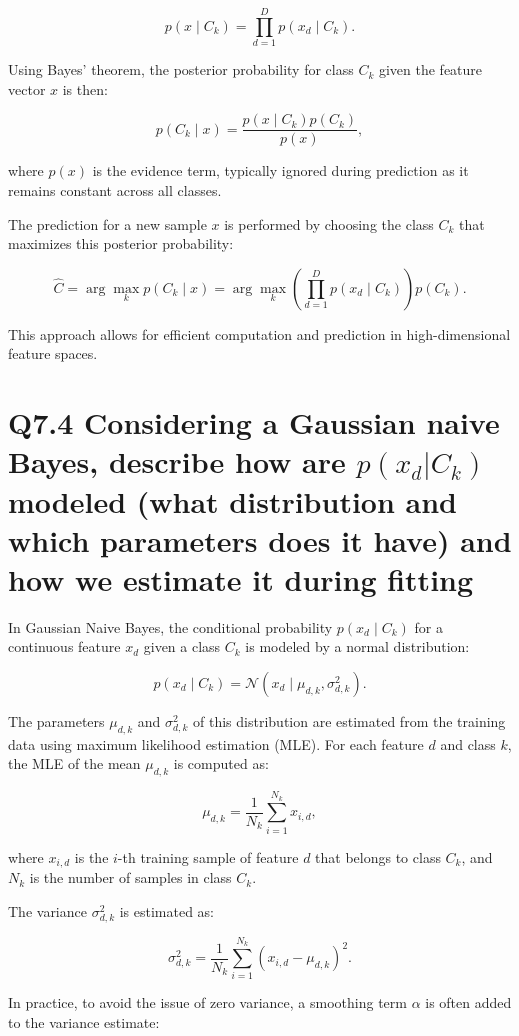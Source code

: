 \documentclass[11pt]{article}
\begin{document}
\[
p(x \mid C_k) = \prod_{d=1}^{D} p(x_d \mid C_k).
\]

Using Bayes' theorem, the posterior probability for class \( C_k \) given the feature vector \( x \) is then:

\[
p(C_k \mid x) = \frac{p(x \mid C_k) p(C_k)}{p(x)},
\]

where \( p(x) \) is the evidence term, typically ignored during prediction as it remains constant across all classes.

The prediction for a new sample \( x \) is performed by choosing the class \( C_k \) that maximizes this posterior probability:

\[
\hat{C} = \arg\max_k p(C_k \mid x) = \arg\max_k \left( \prod_{d=1}^{D} p(x_d \mid C_k) \right) p(C_k).
\]

This approach allows for efficient computation and prediction in high-dimensional feature spaces.

\section{Q7.4 Considering a Gaussian naive Bayes, describe how are $p(x_d|C_k)$ modeled (what distribution and which parameters does it have) and how we estimate it during fitting}

In Gaussian Naive Bayes, the conditional probability \( p(x_d \mid C_k) \) for a continuous feature \( x_d \) given a class \( C_k \) is modeled by a normal distribution:

\[
p(x_d \mid C_k) = \mathcal{N}(x_d \mid \mu_{d,k}, \sigma_{d,k}^2).
\]

The parameters \( \mu_{d,k} \) and \( \sigma_{d,k}^2 \) of this distribution are estimated from the training data using maximum likelihood estimation (MLE). For each feature \( d \) and class \( k \), the MLE of the mean \( \mu_{d,k} \) is computed as:

\[
\mu_{d,k} = \frac{1}{N_k} \sum_{i=1}^{N_k} x_{i,d},
\]

where \( x_{i,d} \) is the \( i \)-th training sample of feature \( d \) that belongs to class \( C_k \), and \( N_k \) is the number of samples in class \( C_k \).

The variance \( \sigma_{d,k}^2 \) is estimated as:

\[
\sigma_{d,k}^2 = \frac{1}{N_k} \sum_{i=1}^{N_k} (x_{i,d} - \mu_{d,k})^2.
\]

In practice, to avoid the issue of zero variance, a smoothing term \( \alpha \) is often added to the variance estimate:
\end{document}
